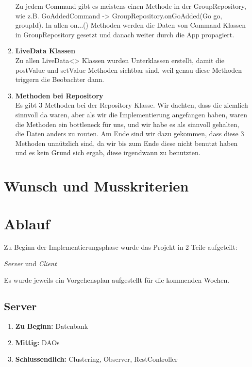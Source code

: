 \documentclass[11pt,a4paper]{scrartcl}
\begin{document}
\begin{enumerate}
Zu jedem Command gibt es meistens einen Methode in der GroupRepository, wie z.B. GoAddedCommand -> GroupRepository.onGoAdded(Go go, groupId). In allen on...() Methoden werden die Daten von Command Klassen in GroupRepository gesetzt und danach weiter durch die App propagiert.

\item \textbf{LiveData Klassen}\\

Zu allen LiveData<> Klassen wurden Unterklassen erstellt, damit die postValue und setValue Methoden sichtbar sind, weil genau diese Methoden triggern die Beobachter dann.

\item \textbf{Methoden bei Repository}\\

Es gibt 3 Methoden bei der Repository Klasse. Wir dachten, dass die ziemlich sinnvoll da waren, aber als wir die Implementierung angefangen haben, waren die Methoden ein bottleneck für uns, und wir habe es als sinnvoll gehalten, die Daten anders zu routen. Am Ende sind wir dazu gekommen, dass diese 3 Methoden unnützlich sind, da wir bis zum Ende diese nicht benutzt haben und es kein Grund sich ergab, diese irgendwann zu benutzten.
	
\end{enumerate}

\newpage

\section{Wunsch und Musskriterien}

\newpage

\section{Ablauf}

Zu Beginn der Implementierungsphase wurde das Projekt in 2 Teile aufgeteilt:

\textit{Server} und \textit{Client}

Es wurde jeweils ein Vorgehensplan aufgestellt für die kommenden Wochen.

\subsection{Server}

\begin{enumerate}
	\item \textbf{Zu Beginn:} Datenbank
	
	\item \textbf{Mittig:} DAOs
	
	\item \textbf{Schlussendlich:} Clustering, Observer, RestController
	
\end{enumerate}
\end{document}
